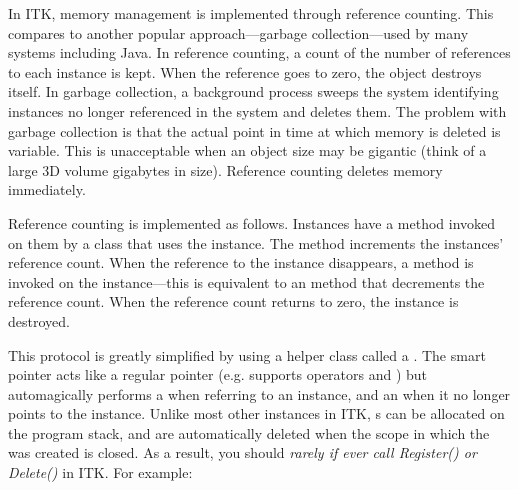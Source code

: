 In ITK, memory management is implemented through reference counting. This
compares to another popular approach---garbage collection---used by many
systems including Java. In reference counting, a count of the number of
references to each instance is kept. When the reference goes to zero, the
object destroys itself. In garbage collection, a background process sweeps
the system identifying instances no longer referenced in the system and
deletes them. The problem with garbage collection is that the actual point in
time at which memory is deleted is variable. This is unacceptable when an
object size may be gigantic (think of a large 3D volume gigabytes in
size). Reference counting deletes memory immediately.

Reference counting is implemented as follows. Instances have a
 method invoked on them by a class that uses the
instance. The  method increments the instances' reference
count. When the reference to the instance disappears, a 
method is invoked on the instance---this is equivalent to an
 method that decrements the reference count. When the
reference count returns to zero, the instance is destroyed.

This protocol is greatly simplified by using a helper class called a
. The smart pointer acts like a regular pointer 
(e.g. supports operators \code{->} and \code{*}) but automagically
performs a  when referring to an instance, and an
 when it no longer points to the instance.  Unlike
most other instances in ITK, s can be allocated
on the program stack, and are automatically deleted when the scope in
which the  was created is closed. As a result, you should
\emph{rarely if ever call Register() or Delete()} in ITK. For example:

